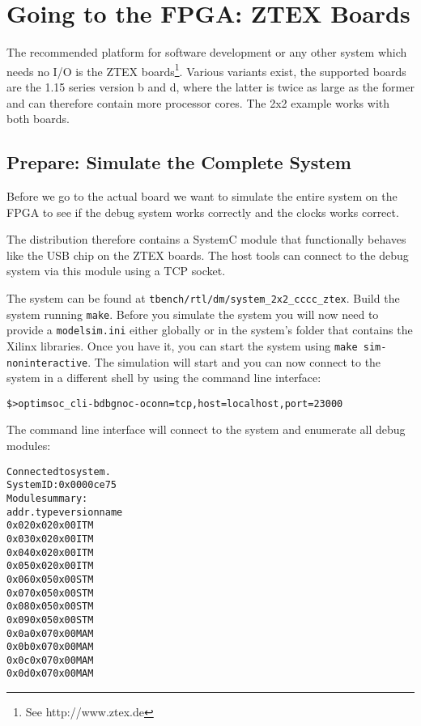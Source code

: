 \section{Going to the FPGA: ZTEX Boards}

The recommended platform for software development or any other system
which needs no I/O is the ZTEX boards\footnote{See
  http://www.ztex.de}. Various variants exist, the supported boards
are the 1.15 series version b and d, where the latter is twice as
large as the former and can therefore contain more processor cores.
The 2x2 example works with both boards.

\subsection{Prepare: Simulate the Complete System}

Before we go to the actual board we want to simulate the entire system
on the FPGA to see if the debug system works correctly and the
clocks works correct.

The distribution therefore contains a SystemC module that functionally
behaves like the USB chip on the ZTEX boards. The host tools can
connect to the debug system via this module using a TCP socket.

The system can be found at \verb|tbench/rtl/dm/system_2x2_cccc_ztex|.
Build the system running \verb|make|. Before you simulate the system
you will now need to provide a \verb|modelsim.ini| either globally or
in the system's folder that contains the Xilinx libraries. Once you
have it, you can start the system using
\verb|make sim-noninteractive|. The simulation will start and you
can now connect to the system in a different shell by using the
command line interface:

\begin{alltt}
\$> optimsoc_cli -bdbgnoc -oconn=tcp,host=localhost,port=23000
\end{alltt}

The command line interface will connect to the system and enumerate
all debug modules:

\begin{alltt}
Connected to system.
System ID: 0x0000ce75
Module summary:
addr.	type	version	name
0x02	0x02	0x00	ITM
0x03	0x02	0x00	ITM
0x04	0x02	0x00	ITM
0x05	0x02	0x00	ITM
0x06	0x05	0x00	STM
0x07	0x05	0x00	STM
0x08	0x05	0x00	STM
0x09	0x05	0x00	STM
0x0a	0x07	0x00	MAM
0x0b	0x07	0x00	MAM
0x0c	0x07	0x00	MAM
0x0d	0x07	0x00	MAM
\end{alltt}

